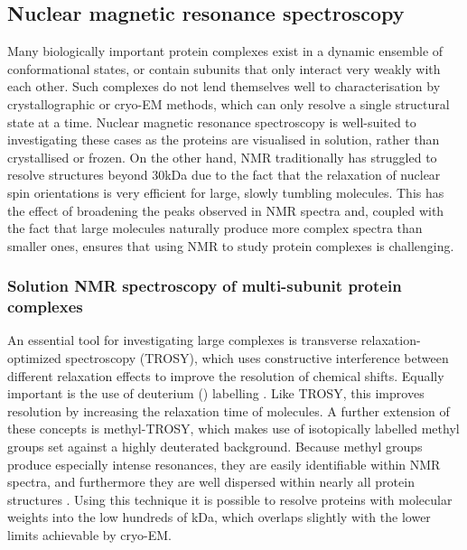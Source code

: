\documentclass[a4paper,11pt,twoside,openright]{scrbook}
\begin{document}
\subsection{Nuclear magnetic resonance spectroscopy}
Many biologically important protein complexes exist in a dynamic ensemble of conformational states, or contain subunits that only interact very weakly with each other. Such complexes do not lend themselves well to characterisation by crystallographic or cryo-EM methods, which can only resolve a single structural state at a time. Nuclear magnetic resonance spectroscopy is well-suited to investigating these cases as the proteins are visualised in solution, rather than crystallised or frozen. On the other hand, NMR traditionally has struggled to resolve structures beyond 30kDa due to the fact that the relaxation of nuclear spin orientations is very efficient for large, slowly tumbling molecules. This has the effect of broadening the peaks observed in NMR spectra and, coupled with the fact that large molecules naturally produce more complex spectra than smaller ones, ensures that using NMR to study protein complexes is challenging.

\subsubsection{Solution NMR spectroscopy of multi-subunit protein complexes}
An essential tool for investigating large complexes is transverse relaxation-optimized spectroscopy \cite{Pervushin1997} (TROSY), which uses constructive interference between different relaxation effects to improve the resolution of chemical shifts. Equally important is the use of deuterium () labelling \cite{Sattler1996}. Like TROSY, this improves resolution by increasing the relaxation time of molecules. A further extension of these concepts is methyl-TROSY, which makes use of isotopically labelled  methyl groups set against a highly deuterated background. Because methyl groups produce especially intense resonances, they are easily identifiable within NMR spectra, and furthermore they are well dispersed within nearly all protein structures \cite{Ollerenshaw2003}. Using this technique it is possible to resolve proteins with molecular weights into the low hundreds of kDa, which overlaps slightly with the lower limits achievable by cryo-EM.
\end{document}
